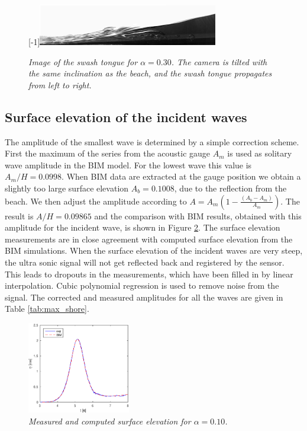 \documentclass[review, authoryear]{elsarticle}
\begin{document}
\begin{figure}[]
\centering
\scalebox{1}[-1]{\includegraphics[angle=175,width=0.7\textwidth]{./Figures/BUBBLE/runup30_large_fov}}
\caption{\textit{Image of the swash tongue for $\alpha=0.30$. The camera is tilted with the same inclination as the beach, and the swash tongue propagates from left to right.}}
\label{fig:boble_bevis}
\end{figure}

\subsection{Surface elevation of the incident waves}
\label{surf_elev}
The amplitude of the smallest wave is determined by
a simple correction scheme. First the maximum of the series from the 
acoustic gauge $A_m$ is used as solitary wave amplitude in the BIM model.
For the lowest wave this value is $A_m/H=0.0998$.
When BIM data are extracted at the gauge position we obtain 
a slightly too large surface elevation $A_b=0.1008$, due to the reflection from 
the beach. We then adjust the amplitude 
according to $A=A_m (1- \frac{ (A_b-A_m)}{A_m})$. 
The result is $A/H=0.09865$ and the comparison with BIM results, obtained with this amplitude for the incident wave, is shown in Figure \ref{fig:surf_ele1}.
The surface elevation measurements are in close agreement with computed surface elevation from the BIM simulations. 
When the surface elevation of the incident waves are very steep, the ultra sonic signal will not get reflected back and registered by the sensor. 
This leads to dropouts in the measurements, which have been filled in by linear interpolation.  Cubic polynomial regression is used to remove noise from the signal.  The corrected and measured amplitudes for all the  waves are given in Table \ref{tab:max_shore}.



\begin{figure}
\centering
\includegraphics[width=0.4\textwidth]{./Figures/surf_ele10_2016.eps}
\caption{\textit{Measured and computed surface elevation for $\alpha=0.10$. }}
\label{fig:surf_ele1}
\end{figure}
\end{document}
